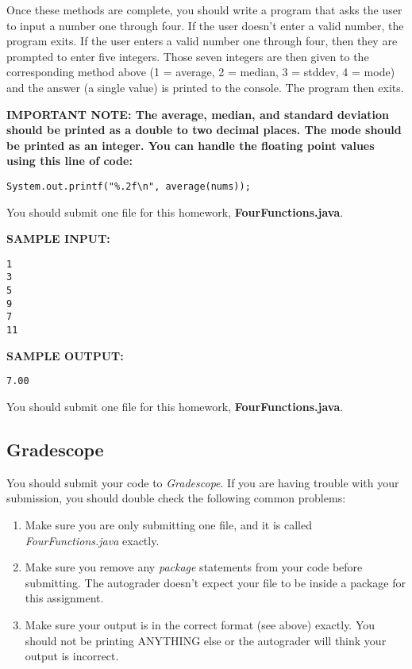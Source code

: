 \documentclass[paper=a4, fontsize=11pt, parskip=full]{scrartcl} %
\numberwithin{equation}{section} %
\numberwithin{figure}{section} %
\numberwithin{table}{section} %
\begin{document}
Once these methods are complete, you should write a program that asks the user to input a number one through four. If the user doesn't enter a valid number, the program exits. If the user enters a valid number one through four, then they are prompted to enter five integers. Those seven integers are then given to the corresponding method above (1 = average, 2 = median, 3 = stddev, 4 = mode) and the answer (a single value) is printed to the console. The program then exits.

\textbf{IMPORTANT NOTE: The average, median, and standard deviation should be printed as a double to two decimal places. The mode should be printed as an integer. You can handle the floating point values using this line of code:}

\begin{lstlisting}
System.out.printf("%.2f\n", average(nums));
\end{lstlisting}

You should submit one file for this homework, \textbf{FourFunctions.java}.

\textbf{SAMPLE INPUT:}

\begin{lstlisting}
1
3
5
9
7
11
\end{lstlisting}

\textbf{SAMPLE OUTPUT:}

\begin{lstlisting}
7.00
\end{lstlisting}

You should submit one file for this homework, \textbf{FourFunctions.java}.

\subsection{Gradescope}

You should submit your code to \emph{Gradescope}. If you are having trouble with your submission, you should double check the following common problems:

\begin{enumerate}
	\item Make sure you are only submitting one file, and it is called \emph{FourFunctions.java} exactly.
	\item Make sure you remove any \emph{package} statements from your code before submitting. The autograder doesn't expect your file to be inside a package for this assignment.
	\item Make sure your output is in the correct format (see above) exactly. You should not be printing ANYTHING else or the autograder will think your output is incorrect.
\end{enumerate}


\end{document}
